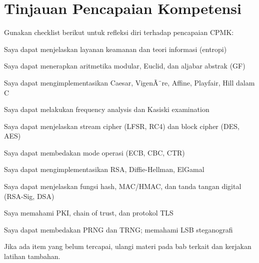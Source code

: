 ﻿\section{Tinjauan Pencapaian Kompetensi}

Gunakan checklist berikut untuk refleksi diri terhadap pencapaian CPMK:

\begin{checklist}
  \item Saya dapat menjelaskan layanan keamanan dan teori informasi (entropi)
  \item Saya dapat menerapkan aritmetika modular, Euclid, dan aljabar abstrak (GF)
  \item Saya dapat mengimplementasikan Caesar, VigenÃ¨re, Affine, Playfair, Hill dalam C
  \item Saya dapat melakukan frequency analysis dan Kasiski examination
  \item Saya dapat menjelaskan stream cipher (LFSR, RC4) dan block cipher (DES, AES)
  \item Saya dapat membedakan mode operasi (ECB, CBC, CTR)
  \item Saya dapat mengimplementasikan RSA, Diffie-Hellman, ElGamal
  \item Saya dapat menjelaskan fungsi hash, MAC/HMAC, dan tanda tangan digital (RSA-Sig, DSA)
  \item Saya memahami PKI, chain of trust, dan protokol TLS
  \item Saya dapat membedakan PRNG dan TRNG; memahami LSB steganografi
\end{checklist}

Jika ada item yang belum tercapai, ulangi materi pada bab terkait dan kerjakan latihan tambahan.

